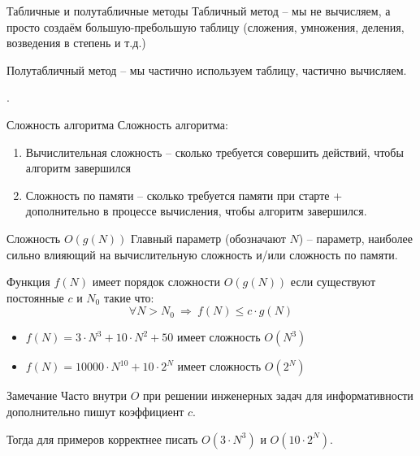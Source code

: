 \begin{frame}{Табличные и полутабличные методы}
	Табличный метод -- мы не вычисляем, а просто создаём большую-пребольшую таблицу (сложения, умножения, деления, возведения в степень и т.д.)
	
	
	Полутабличный метод -- мы частично используем таблицу, частично вычисляем.
	
	.
\end{frame}


\begin{frame}{Сложность алгоритма}
	Сложность алгоритма:
	\begin{enumerate}
		\item Вычислительная сложность -- сколько требуется совершить действий, чтобы алгоритм завершился
		\item Сложность по памяти -- сколько требуется памяти при старте + дополнительно в процессе вычисления, чтобы алгоритм завершился.
	\end{enumerate}
	
	

\end{frame}



\begin{frame}{Сложность $O(g(N))$}
	\footnotesize
	{Главный параметр} (обозначают $N$) -- параметр, наиболее сильно влияющий на вычислительную сложность 
	и/или сложность по памяти.
	
	
	Функция $f(N)$ имеет порядок сложности $O(g(N))$ 
	если существуют постоянные $c$ и $N_0$ такие что:
	\begin{equation}
	\forall N > N_0  ~\Longrightarrow~ f(N)  \leqslant c \cdot g(N)
	\end{equation}
	
	\begin{itemize}
		\item $f(N)=3 \cdot N^3 + 10 \cdot N^2 + 50$ имеет сложность $O(N^3)$
		\item $f(N)=10000 \cdot N^{10} + 10 \cdot 2^N$ имеет сложность $O(2^N)$
	\end{itemize}

	\begin{block}{Замечание}
		Часто внутри $O$ при решении инженерных задач
		для информативности дополнительно пишут коэффициент $c$.
		
		Тогда для примеров корректнее писать $O(3 \cdot N^3)$ и $O(10 \cdot 2^N)$.
	\end{block}
\end{frame}

